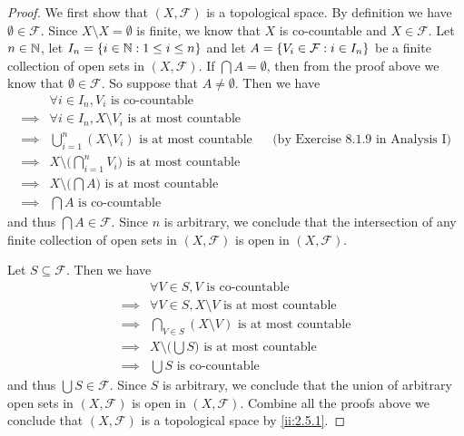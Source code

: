 \begin{proof}
  We first show that \((X, \mathcal{F})\) is a topological space.
  By definition we have \(\emptyset \in \mathcal{F}\).
  Since \(X \setminus X = \emptyset\) is finite, we know that \(X\) is co-countable and \(X \in \mathcal{F}\).
  Let \(n \in \mathbb{N}\), let \(I_n = \left\lbrace i \in \mathbb{N} : 1 \leq i \leq n\right\rbrace\) and let \(A = \left\lbrace V_i \in \mathcal{F} : i \in I_n\right\rbrace\) be a finite collection of open sets in \((X, \mathcal{F})\).
  If \(\bigcap A = \emptyset\), then from the proof above we know that \(\emptyset \in \mathcal{F}\).
  So suppose that \(A \neq \emptyset\).
  Then we have
  \begin{align*}
             & \forall i \in I_n, V_i \text{ is co-countable}                                                                           \\
    \implies & \forall i \in I_n, X \setminus V_i \text{ is at most countable}                                                          \\
    \implies & \bigcup_{i = 1}^n (X \setminus V_i) \text{ is at most countable}           &  & \text{(by Exercise 8.1.9 in Analysis I)} \\
    \implies & X \setminus \bigg(\bigcap_{i = 1}^n V_i\bigg) \text{ is at most countable}                                               \\
    \implies & X \setminus \bigg(\bigcap A\bigg) \text{ is at most countable}                                                           \\
    \implies & \bigcap A \text{ is co-countable}
  \end{align*}
  and thus \(\bigcap A \in \mathcal{F}\).
  Since \(n\) is arbitrary, we conclude that the intersection of any finite collection of open sets in \((X, \mathcal{F})\) is open in \((X, \mathcal{F})\).

  Let \(S \subseteq \mathcal{F}\).
  Then we have
  \begin{align*}
             & \forall V \in S, V \text{ is co-countable}                     \\
    \implies & \forall V \in S, X \setminus V \text{ is at most countable}    \\
    \implies & \bigcap_{V \in S} (X \setminus V) \text{ is at most countable} \\
    \implies & X \setminus \bigg(\bigcup S\bigg) \text{ is at most countable} \\
    \implies & \bigcup S \text{ is co-countable}
  \end{align*}
  and thus \(\bigcup S \in \mathcal{F}\).
  Since \(S\) is arbitrary, we conclude that the union of arbitrary open sets in \((X, \mathcal{F})\) is open in \((X, \mathcal{F})\).
  Combine all the proofs above we conclude that \((X, \mathcal{F})\) is a topological space by \cref{ii:2.5.1}.


\end{proof}
